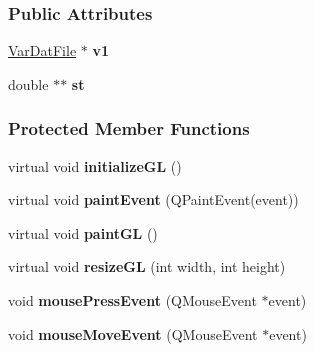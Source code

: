 \subsubsection*{\-Public \-Attributes}
\begin{DoxyCompactItemize}
\item 
\hypertarget{classAnimation_af8d0da3e35bb5e28aba9329efffbfb95}{\hyperlink{classVarDatFile}{\-Var\-Dat\-File} $\ast$ {\bfseries v1}}\label{classAnimation_af8d0da3e35bb5e28aba9329efffbfb95}

\item 
\hypertarget{classAnimation_a6bd842874c8ee75e7889fabdbb9f98b2}{double $\ast$$\ast$ {\bfseries st}}\label{classAnimation_a6bd842874c8ee75e7889fabdbb9f98b2}

\end{DoxyCompactItemize}
\subsubsection*{\-Protected \-Member \-Functions}
\begin{DoxyCompactItemize}
\item 
\hypertarget{classAnimation_a2d3d45239c78255c23a70ca558b4d4f1}{virtual void {\bfseries initialize\-G\-L} ()}\label{classAnimation_a2d3d45239c78255c23a70ca558b4d4f1}

\item 
\hypertarget{classAnimation_adc7aa19ed77af08ab367a6cb77d2c13c}{virtual void {\bfseries paint\-Event} (\-Q\-Paint\-Event(event))}\label{classAnimation_adc7aa19ed77af08ab367a6cb77d2c13c}

\item 
\hypertarget{classAnimation_ac5cbfafb28ef4c0474ae96437294f547}{virtual void {\bfseries paint\-G\-L} ()}\label{classAnimation_ac5cbfafb28ef4c0474ae96437294f547}

\item 
\hypertarget{classAnimation_a3efe88f982dbec7825725dd954991139}{virtual void {\bfseries resize\-G\-L} (int width, int height)}\label{classAnimation_a3efe88f982dbec7825725dd954991139}

\item 
\hypertarget{classAnimation_ad2272e344e46519f026cd02f419884f1}{void {\bfseries mouse\-Press\-Event} (\-Q\-Mouse\-Event $\ast$event)}\label{classAnimation_ad2272e344e46519f026cd02f419884f1}

\item 
\hypertarget{classAnimation_ae820c6a86f0a1908bf451f86db043489}{void {\bfseries mouse\-Move\-Event} (\-Q\-Mouse\-Event $\ast$event)}\label{classAnimation_ae820c6a86f0a1908bf451f86db043489}

\end{DoxyCompactItemize}


